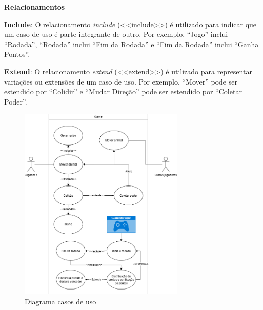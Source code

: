 \textbf{Relacionamentos}

\textbf{Include}: O relacionamento \textit{include} (\textless\textless include\textgreater\textgreater) é utilizado para indicar que um caso de uso é parte integrante de outro. Por exemplo, ``Jogo'' inclui ``Rodada'', ``Rodada'' inclui ``Fim da Rodada'' e ``Fim da Rodada'' inclui ``Ganha Pontos''.

\textbf{Extend}: O relacionamento \textit{extend} (\textless\textless extend\textgreater\textgreater) é utilizado para representar variações ou extensões de um caso de uso. Por exemplo, ``Mover'' pode ser estendido por ``Colidir'' e ``Mudar Direção'' pode ser estendido por ``Coletar Poder''.

\begin{figure}[htbp]
    \centering
    \caption{Diagrama casos de uso}
    \label{fig:use-case}
    \includegraphics[width=0.7\textwidth]{figuras/diagrama-uso.png}
\end{figure}